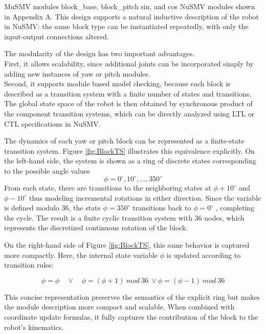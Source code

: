 

MuSMV modules block\_base, block\_pitch sin, and cos NuSMV modules shown in Appendix A.
This design supports a natural inductive description of 
the robot in NuSMV: the same block type can be instantiated repeatedly, 
with only the input-output connections altered.

The modularity of the design has two important advantages.\\
First, it allows scalability, since additional joints can be incorporated 
simply by adding new instances of yaw or pitch modules. \\
Second, it supports module based model checking, because each block is described 
as a transition system with a finite number of states and transitions. 
The global state space of the robot is then obtained by synchronous product of 
the component transition systems, which can be directly 
analyzed using LTL or CTL specifications in NuSMV.

The dynamics of each yaw or pitch block can be represented as a finite-state transition system. 
Figure \ref{fig:BlockTS} illustrates this equivalence explicitly. 
On the left-hand side, the system is shown as a ring of discrete states 
corresponding to the possible angle values 
\[ \phi=0^\circ,10^\circ,…,350^\circ \]
From each state, there are transitions to the neighboring states at 
$ \phi+10^\circ $
 and 
 $ \phi-10^\circ $
thus modeling incremental rotations in either direction. Since the variable is defined modulo 36, the state 
$ \phi=350^\circ $
 transitions back to 
 $ \phi=0^\circ $
, completing the cycle. The result is a finite cyclic transition system with 36 nodes, 
which represents the discretized continuous rotation of the block.

On the right-hand side of Figure \ref{fig:BlockTS}, this same behavior is captured more compactly.
Here, the internal state variable $\phi$ is updated according to transition rules:

\[ \phi=\phi \quad \lor \quad \phi=(\phi+1)\ mod\ 36\ \lor \phi=(\phi-1)\ mod\ 36 \]

This concise representation preserves the semantics of the explicit ring but makes the 
module description more compact and scalable. When combined with coordinate update 
formulas, it fully captures the contribution of the block to the robot’s kinematics.

